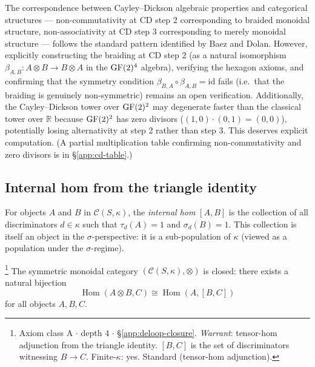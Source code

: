 \begin{remark}
The correspondence between Cayley--Dickson algebraic
properties and categorical structures ---
non-commutativity at CD step 2 corresponding to braided
monoidal structure, non-associativity at CD step 3
corresponding to merely monoidal structure --- follows
the standard pattern identified by Baez and Dolan.
However, explicitly constructing the braiding at CD
step 2 (as a natural isomorphism
$\beta_{A,B}: A \otimes B \to B \otimes A$ in the
$\operatorname{GF}(2)^4$ algebra), verifying the hexagon axioms, and
confirming that the symmetry condition
$\beta_{B,A} \circ \beta_{A,B} = \mathrm{id}$ fails
(i.e.\ that the braiding is genuinely non-symmetric)
remains an open verification. Additionally, the
Cayley--Dickson tower over $\operatorname{GF}(2)^2$ may degenerate
faster than the classical tower over $\mathbb{R}$
because $\operatorname{GF}(2)^2$ has zero divisors
($(1,0) \cdot (0,1) = (0,0)$), potentially losing
alternativity at step 2 rather than step 3. This
deserves explicit computation. (A partial multiplication table confirming non-commutativity and zero divisors is in \S\ref{app:cd-table}.)
\end{remark}

\subsection{Internal hom from the triangle identity}

\begin{definition}\label{def:internal-hom}
For objects $A$ and $B$ in $\mathcal{C}(S,\kappa)$, the
\emph{internal hom} $[A, B]$ is the collection of all
discriminators $d \in \kappa$ such that $\tau_d(A) = 1$
and $\sigma_d(B) = 1$. This collection is itself an
object in the $\sigma$-perspective: it is a sub-population
of $\kappa$ (viewed as a population under the
$\sigma$-regime).
\end{definition}

\begin{theorem}\label{thm:closure}\footnote{Axiom class \textsf{A} $\cdot$ depth 4 $\cdot$ \S\ref{app:deloop-closure}.  \emph{Warrant}: tensor-hom adjunction from the triangle identity. $[B,C]$ is the set of discriminators witnessing $B \to C$. Finite-$\kappa$: yes. Standard (tensor-hom adjunction).}
The symmetric monoidal category
$(\mathcal{C}(S,\kappa), \otimes)$ is closed: there
exists a natural bijection
\begin{equation}\label{eq:closure}
  \operatorname{Hom}(A \otimes B, C) \cong
  \operatorname{Hom}(A, [B, C])
\end{equation}
for all objects $A, B, C$.
\end{theorem}

